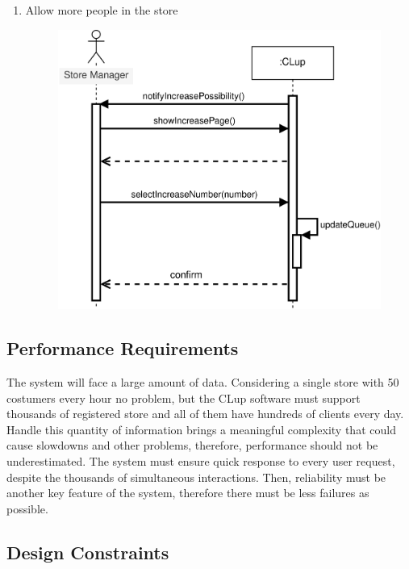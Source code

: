 \documentclass[]{article}
\begin{document}
\begin{enumerate}
						\item Allow more people in the store
							\begin{figure}[H]
								\centering
								\includegraphics[]{AllowMorePPlDiagram.png}
								\caption{}
								\label{fig:buildstats_sequencediagram}
							\end{figure}
						
						\newpage
						\end{enumerate}
		
		\subsection{Performance Requirements}
		
		The system will face a large amount of data. Considering a single store with 50 costumers every hour no problem, but the CLup software must support thousands of registered store and all of them have hundreds of clients every day. Handle this quantity of information brings a meaningful complexity that could cause slowdowns and other problems, therefore, performance should not be underestimated. The system must ensure quick response to every user request, despite the thousands of simultaneous interactions. 
		Then, reliability must be another key feature of the system, therefore there must be less failures as possible.
		
		\subsection{Design Constraints}
		
\end{document}
